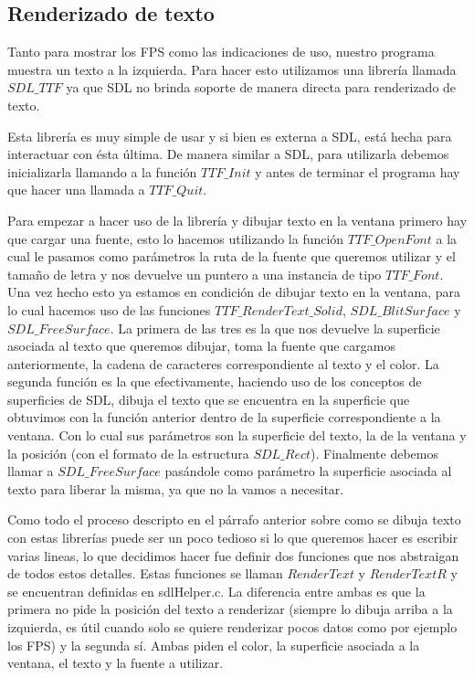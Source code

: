 \documentclass[a4paper]{article}
\newcounter{col}
\begin{document}
\subsection{Renderizado de texto}
Tanto para mostrar los FPS como las indicaciones de uso, nuestro programa muestra un texto a la izquierda. Para hacer esto utilizamos una librería llamada $SDL\_TTF$ ya que SDL no brinda soporte de manera directa para renderizado de texto.
\par Esta librería es muy simple de usar y si bien es externa a SDL, está hecha para interactuar con ésta última. De manera similar a SDL, para utilizarla debemos inicializarla llamando a la función $TTF\_Init$ y antes de terminar el programa hay que hacer una llamada a $TTF\_Quit$.
\par Para empezar a hacer uso de la librería y dibujar texto en la ventana primero hay que cargar una fuente, esto lo hacemos utilizando la función $TTF\_OpenFont$ a la cual le pasamos como parámetros la ruta de la fuente que queremos utilizar y el tamaño de letra y nos devuelve un puntero a una instancia de tipo $TTF\_Font$. Una vez hecho esto ya estamos en condición de dibujar texto en la ventana, para lo cual hacemos uso de las funciones $TTF\_RenderText\_Solid$, $SDL\_BlitSurface$ y $SDL\_FreeSurface$. La primera de las tres es la que nos devuelve la superficie asociada al texto que queremos dibujar, toma la fuente que cargamos anteriormente, la cadena de caracteres correspondiente al texto y el color. La segunda función es la que efectivamente, haciendo uso de los conceptos de superficies de SDL, dibuja el texto que se encuentra en la superficie que obtuvimos con la función anterior dentro de la superficie correspondiente a la ventana. Con lo cual sus parámetros son la superficie del texto, la de la ventana y la posición (con el formato de la estructura $SDL\_Rect$). Finalmente debemos llamar a $SDL\_FreeSurface$ pasándole como parámetro la superficie asociada al texto para liberar la misma, ya que no la vamos a necesitar.
\par Como todo el proceso descripto en el párrafo anterior sobre como se dibuja texto con estas librerías puede ser un poco tedioso si lo que queremos hacer es escribir varias lineas, lo que decidimos hacer fue definir dos funciones que nos abstraigan de todos estos detalles. Estas funciones se llaman $RenderText$ y $RenderTextR$ y se encuentran definidas en sdlHelper.c. La diferencia entre ambas es que la primera no pide la posición del texto a renderizar (siempre lo dibuja arriba a la izquierda, es útil cuando solo se quiere renderizar pocos datos como por ejemplo los FPS) y la segunda sí. Ambas piden el color, la superficie asociada a la ventana, el texto y la fuente a utilizar.
\end{document}
